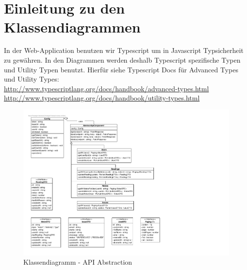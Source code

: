 
\section{Einleitung zu den Klassendiagrammen}
In der Web-Application benutzen wir Typescript um in Javascript Typsicherheit zu gewähren. In den Diagrammen werden deshalb Typescript spezifische Typen und Utility Typen benutzt. Hierfür siehe Typescript Docs für Advanced Types und Utility Types: \\
\url{http://www.typescriptlang.org/docs/handbook/advanced-types.html} \\
\url{http://www.typescriptlang.org/docs/handbook/utility-types.html}

\begin{figure}[H]
	\hspace{-3cm}
	\includegraphics[scale = 0.9]{./img/Diagrams/api-classDiagram}
	\caption{Klassendiagramm - API Abstraction}
\end{figure}
\newpage

